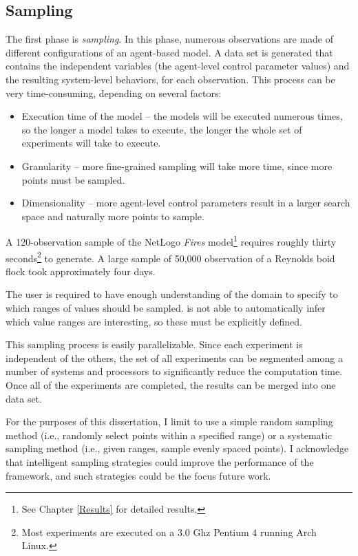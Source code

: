 \subsection{Sampling}
The first phase is \textit{sampling}.
In this phase, numerous observations are made of different configurations of an agent-based model.
A data set is generated that contains the independent variables (the agent-level control parameter values) and the resulting system-level behaviors, for each observation.
This process can be very time-consuming, depending on several factors:
\begin{itemize}
  \item Execution time of the model -- the models will be executed numerous times, so the longer a model takes to execute, the longer the whole set of experiments will take to execute.
  \item Granularity -- more fine-grained sampling will take more time, since more points must be sampled.
  \item Dimensionality -- more agent-level control parameters result in a larger search space and naturally more points to sample.
\end{itemize}
A 120-observation sample of the NetLogo \textit{Fires} model\footnote{See Chapter \ref{Results} for detailed results.} \cite{fires} requires roughly thirty seconds\footnote{Most experiments are executed on a 3.0 Ghz Pentium 4 running Arch Linux.} to generate.
A large sample of 50,000 observation of a Reynolds boid flock \cite{reynolds1987} took approximately four days.

The user is required to have enough understanding of the domain to specify to \fw which  ranges of values should be sampled.
\fw is not able to automatically infer which value ranges are interesting, so these must be explicitly defined.

This sampling process is easily parallelizable.
Since each experiment is independent of the others, the set of all experiments can be segmented among a number of systems and processors to significantly reduce the computation time.
Once all of the experiments are completed, the results can be merged into one data set.

For the purposes of this dissertation, I limit \fw to use a simple random sampling method (i.e., randomly select points within a specified range) or a systematic sampling method (i.e., given ranges, sample evenly spaced points).
I acknowledge that intelligent sampling strategies could improve the performance of the framework, and such strategies could be the focus future work.


